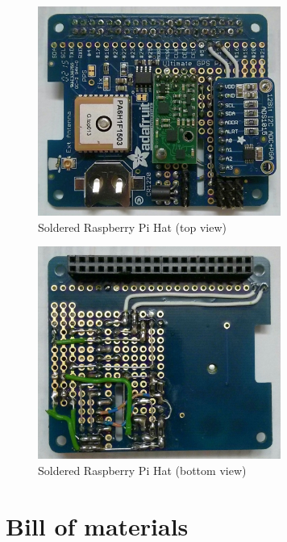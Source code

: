 \begin{figure}[H]
    \centering
    \includegraphics[width=0.71\textwidth]{fig/ch-rpi-hardware/picHatTop}
    \caption{Soldered Raspberry Pi Hat (top view)}
    \label{fig:hardware:mountedHat:top}
\end{figure}

\begin{figure}[H]
    \centering
    \includegraphics[width=0.71\textwidth]{fig/ch-rpi-hardware/picHatBottom}
    \caption{Soldered Raspberry Pi Hat (bottom view)}
    \label{fig:hardware:mountedHat:bottom}
\end{figure}

\newpage
\section{Bill of materials}
\label{sec:hardware:BillOfMat}

